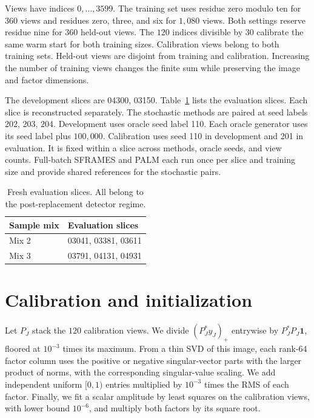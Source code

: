 \documentclass[11pt]{article}
\begin{document}
Views have indices \(0,\ldots,3599\). The training set uses residue zero modulo
ten for \(360\) views and residues zero, three, and six for \(1{,}080\)
views. Both settings reserve residue nine for \(360\) held-out views. The
\(120\) indices divisible by \(30\) calibrate the same warm start for both
training sizes. Calibration views belong to both training sets. Held-out
views are disjoint from training and calibration. Increasing the number of
training views changes the finite sum while preserving the image and factor
dimensions.

The development slices are 04300, 03150.
Table~\ref{tab:sample-slices} lists the evaluation slices. Each slice is
reconstructed separately. The stochastic methods are paired at seed labels
202, 203, 204. Development uses oracle seed label
110. Each oracle generator
uses its seed label plus \(100{,}000\). Calibration uses seed
110 in development and
201 in evaluation. It is fixed within a
slice across methods, oracle seeds, and view counts. Full-batch SFRAMES and PALM
each run once per slice and training size and provide shared references for
the stochastic pairs.

\begin{table}[!htbp]
\centering
\caption{Fresh evaluation slices. All belong to the post-replacement detector regime.}
\label{tab:sample-slices}
\small
\setlength{\tabcolsep}{4pt}
\begin{tabular}{@{}ll@{}}
\toprule
Sample mix & Evaluation slices \\
\midrule
Mix 2 & 03041, 03381, 03611 \\
Mix 3 & 03791, 04131, 04931 \\
\bottomrule
\end{tabular}
\end{table}

\section{Calibration and initialization}
Let \(P_J\) stack the \(120\) calibration views. We divide
\((P_J^\ast y_J)_+\) entrywise by \(P_J^\ast P_J\mathbf1\), floored at
\(10^{-3}\) times its maximum. From a thin SVD of this image, each
rank-\(64\) factor column uses the positive or negative singular-vector
parts with the larger product of norms, with the corresponding singular-value
scaling. We add independent uniform \([0,1)\) entries multiplied by
\(10^{-3}\) times the RMS of each factor. Finally, we fit a scalar
amplitude by least squares on the calibration views, with lower bound
\(10^{-6}\), and multiply both factors by its square root.
\end{document}
